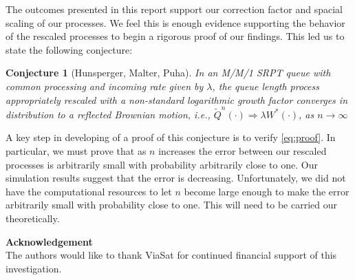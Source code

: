 \documentclass[12pt]{article}
\theoremstyle{plain}
\newtheorem{conjecture}[theorem]{Conjecture}
\theoremstyle{definition}
\theoremstyle{remark}
\begin{document}
The outcomes presented in this report support our correction factor and spacial scaling of our processes. We feel this is enough evidence supporting the behavior of the rescaled processes to begin a rigorous proof of our findings. This led us to state the following conjecture:
\begin{conjecture}[Hunsperger, Malter, Puha]
In an M/M/1 SRPT queue with common processing and incoming rate given by $\lambda$,
the queue length process appropriately rescaled with a non-standard logarithmic growth
factor converges in distribution to a reflected Brownian motion, i.e.,
$\widetilde{Q}^{n}(\cdot) \Rightarrow \lambda W^{*}(\cdot)$, as  $n \rightarrow \infty$
\end{conjecture}
A key step in developing of a proof of this conjecture is to verify \eqref{eq:proof}. In particular, we must prove that as $n$ increases the error between our rescaled processes is arbitrarily small with probability arbitrarily close to one. Our simulation results suggest that the error is decreasing.  Unfortunately, we did not have the computational resources to let $n$ become large enough to make the error arbitrarily small with probability close to one. This will need to be carried our theoretically.


\begin{center}
{\bf Acknowledgement}  \\
The authors would like to thank ViaSat for continued financial support of this investigation.
\end{center}
\end{document}
